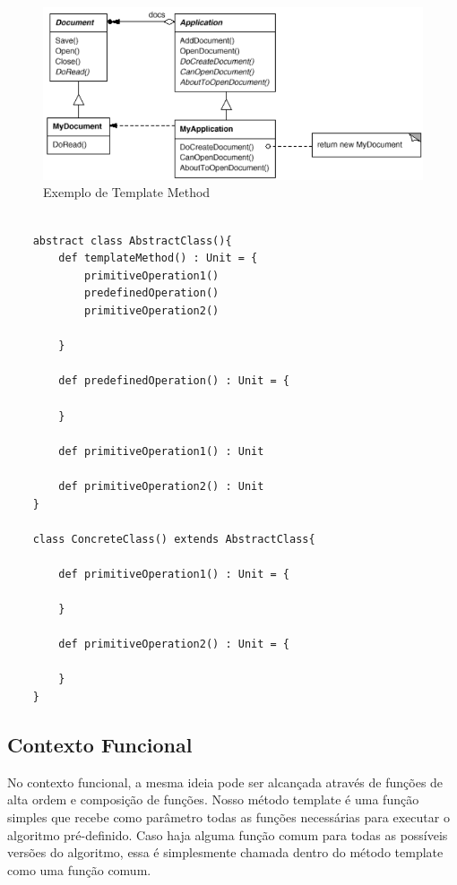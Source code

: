 \begin{figure}[htb]
	\caption{\label{tpmethod_exemplo}Exemplo de Template Method}
	\begin{center}
	    \includegraphics[scale=0.5]{5_padroes-contexto-funcional/5.3_comportamentais/5.3.10_template-method/template-method_exemplo.png}
	\end{center}
\end{figure}

\begin{lstlisting}[caption={Template Method Orientação a Objetos},label=ootpmethod]
    
    abstract class AbstractClass(){
        def templateMethod() : Unit = {
            primitiveOperation1()
            predefinedOperation()
            primitiveOperation2()

        }

        def predefinedOperation() : Unit = {
            
        }

        def primitiveOperation1() : Unit

        def primitiveOperation2() : Unit
    }

    class ConcreteClass() extends AbstractClass{
        
        def primitiveOperation1() : Unit = {
            
        }

        def primitiveOperation2() : Unit = {
            
        }
    }

\end{lstlisting}

\subsection*{Contexto Funcional}

No contexto funcional, a mesma ideia pode ser alcançada através de 
funções de alta ordem e composição de funções. Nosso método template 
é uma função simples que recebe como parâmetro todas as funções necessárias 
para executar o algoritmo pré-definido. Caso haja alguma função comum para 
todas as possíveis versões do algoritmo, essa é simplesmente chamada dentro 
do método template como uma função comum.

